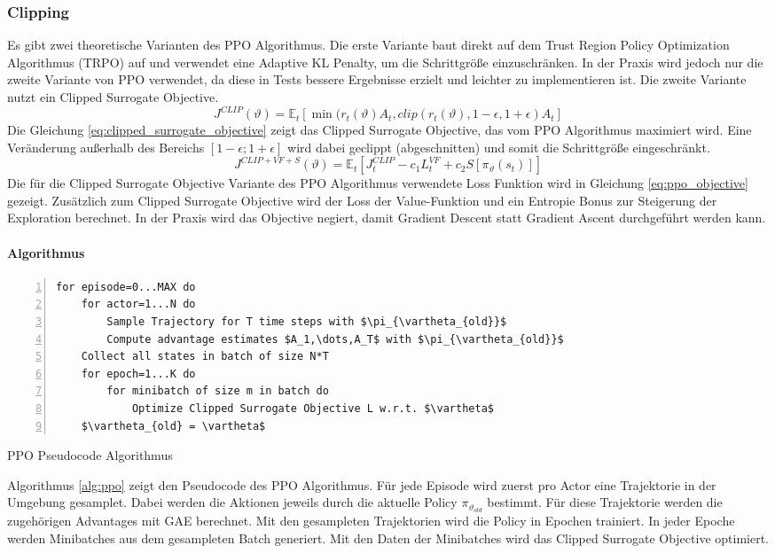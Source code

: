 \subsubsection{Clipping}
Es gibt zwei theoretische Varianten des PPO Algorithmus. Die erste Variante baut direkt auf dem Trust Region Policy Optimization Algorithmus (TRPO) auf und verwendet eine Adaptive KL Penalty, um die Schrittgröße einzuschränken. In der Praxis wird jedoch nur die zweite Variante von PPO verwendet, da diese in Tests bessere Ergebnisse erzielt und leichter zu implementieren ist.
Die zweite Variante nutzt ein Clipped Surrogate Objective.
\begin{equation}
    J^{CLIP}(\vartheta) = \mathbb{E}_t\left[ \min(r_t(\vartheta)A_t,clip(r_t(\vartheta),1-\epsilon,1+\epsilon)A_t \right]
    \label{eq:clipped_surrogate_objective}
\end{equation}
Die Gleichung \ref{eq:clipped_surrogate_objective} zeigt das Clipped Surrogate Objective, das vom PPO Algorithmus maximiert wird. Eine Veränderung außerhalb des Bereichs $[1-\epsilon; 1+\epsilon]$ wird dabei geclippt (abgeschnitten) und somit die Schrittgröße eingeschränkt.
\begin{equation}
    J^{CLIP+VF+S}(\vartheta) = \mathbb{E}_t \left[ J_t^{CLIP} - c_1L_t^{VF} + c_2S[\pi_\vartheta(s_t)] \right]
    \label{eq:ppo_objective}
\end{equation}
Die für die Clipped Surrogate Objective Variante des PPO Algorithmus verwendete Loss Funktion wird in Gleichung \ref{eq:ppo_objective} gezeigt. Zusätzlich zum Clipped Surrogate Objective wird der Loss der Value-Funktion und ein Entropie Bonus zur Steigerung der Exploration berechnet. In der Praxis wird das Objective negiert, damit Gradient Descent statt Gradient Ascent durchgeführt werden kann.

\paragraph{Algorithmus}

\begin{algorithm}
\begin{lstlisting}[mathescape=true, numbers=left]
for episode=0...MAX do
    for actor=1...N do
        Sample Trajectory for T time steps with $\pi_{\vartheta_{old}}$
        Compute advantage estimates $A_1,\dots,A_T$ with $\pi_{\vartheta_{old}}$
    Collect all states in batch of size N*T
    for epoch=1...K do
        for minibatch of size m in batch do
            Optimize Clipped Surrogate Objective L w.r.t. $\vartheta$
    $\vartheta_{old} = \vartheta$
\end{lstlisting}
\caption{PPO Pseudocode Algorithmus}
\label{alg:ppo}
\end{algorithm}

Algorithmus \ref{alg:ppo} zeigt den Pseudocode des PPO Algorithmus. Für jede Episode wird zuerst pro Actor eine Trajektorie in der Umgebung gesamplet. Dabei werden die Aktionen jeweils durch die aktuelle Policy $\pi_{\vartheta_{old}}$ bestimmt. Für diese Trajektorie werden die zugehörigen Advantages mit GAE berechnet. 
Mit den gesampleten Trajektorien wird die Policy in Epochen trainiert. In jeder Epoche werden Minibatches aus dem gesampleten Batch generiert. Mit den Daten der Minibatches wird das Clipped Surrogate Objective optimiert.